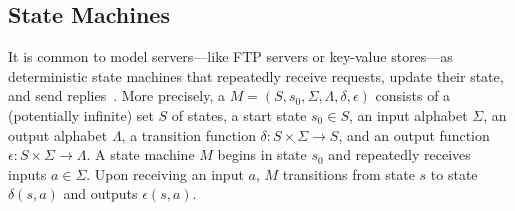 
\subsection{State Machines}
It is common to model servers---like FTP servers or key-value stores---as
deterministic state machines that repeatedly receive requests, update their
state, and send replies~\cite{schneider1990implementing, lamport1998part}. More
precisely, a  $M = (S, s_0, \Sigma,
\Lambda, \delta, \epsilon)$ consists of
  a (potentially infinite) set $S$ of states,
  a start state $s_0 \in S$,
  an input alphabet $\Sigma$,
  an output alphabet $\Lambda$,
  a transition function $\delta: S \times \Sigma \to S$, and
  an output function $\epsilon: S \times \Sigma \to \Lambda$.
A state machine $M$ begins in state $s_0$ and repeatedly receives inputs $a \in
\Sigma$. Upon receiving an input $a$, $M$ transitions from state $s$ to state
$\delta(s, a)$ and outputs $\epsilon(s, a)$.

